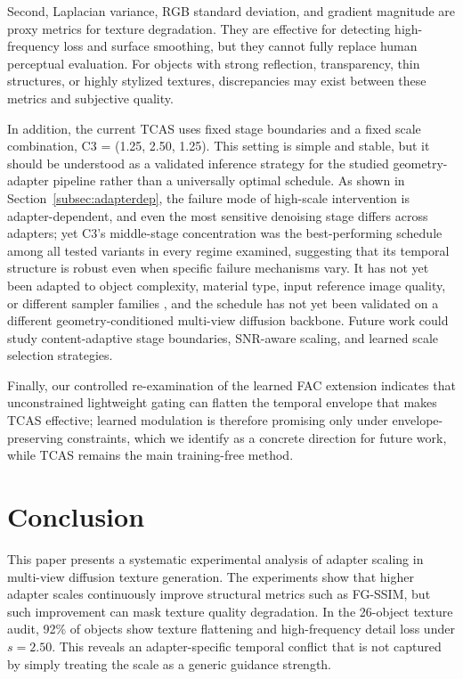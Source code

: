 \documentclass[times,twocolumn,final]{elsarticle}
\providecommand{\DIFadd}[1]{{\protect\color{blue} \sf #1}} %
\providecommand{\DIFaddbegin}{} %
\providecommand{\DIFaddend}{} %
\newcommand{\DIFaddincludegraphics}[2][]{{\color{blue}\fbox{\DIFOincludegraphics[#1]{#2}}}} %
\DeclareRobustCommand{\DIFaddbegin}{\DIFOaddbegin \let\includegraphics\DIFaddincludegraphics} %
\DeclareRobustCommand{\DIFaddend}{\DIFOaddend \let\includegraphics\DIFOincludegraphics} %
\begin{document}
Second, Laplacian variance, RGB standard deviation, and gradient magnitude are proxy metrics for texture degradation. They are effective for detecting high-frequency loss and surface smoothing, but they cannot fully replace human perceptual evaluation. For objects with strong reflection, transparency, thin structures, or highly stylized textures, discrepancies may exist between these metrics and subjective quality.

In addition, the current TCAS uses fixed stage boundaries and a fixed scale combination, C3 = (1.25, 2.50, 1.25). This setting is simple and stable, but it should be understood as a validated inference strategy for the studied geometry-adapter pipeline rather than a universally optimal schedule. As shown in Section~\ref{subsec:adapterdep}, the failure mode of high-scale intervention is adapter-dependent, and even the most sensitive denoising stage differs across adapters; yet C3's middle-stage concentration   \DIFaddbegin \DIFadd{was the best-performing schedule among all tested variants in every regime examined}\DIFaddend , suggesting that its temporal structure is robust even when specific failure mechanisms vary. It has not yet been adapted to object complexity, material type, input reference image quality, or different sampler families\DIFaddbegin \DIFadd{, and the schedule has not yet been validated on a different geometry-conditioned multi-view diffusion backbone}\DIFaddend . Future work could study content-adaptive stage boundaries, SNR-aware scaling, and learned scale selection strategies.

Finally,   \DIFaddbegin \DIFadd{our controlled re-examination of the learned FAC extension indicates that unconstrained lightweight gating can flatten the temporal envelope that makes TCAS effective; learned modulation is therefore promising only under envelope-preserving constraints, which we identify as a concrete direction for future work, while TCAS remains the main }\DIFaddend training-free   method.


\section{Conclusion}
\label{sec:conclusion}

This paper presents a systematic experimental analysis of adapter scaling in multi-view diffusion texture generation. The experiments show that higher adapter scales continuously improve structural metrics such as FG-SSIM, but such improvement can mask texture quality degradation. In the 26-object texture audit, 92\% of objects show texture flattening and high-frequency detail loss under $s = 2.50$. This reveals an adapter-specific temporal conflict that is not captured by simply treating the scale as a generic guidance strength.
\end{document}
